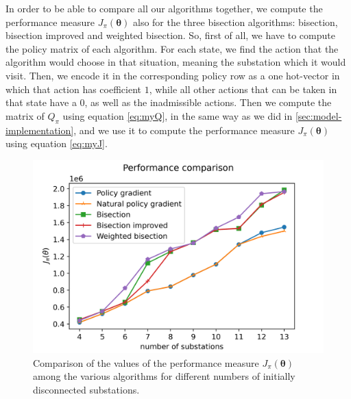 In order to be able to compare all our algorithms together, we compute the performance measure $J_\pi(\boldsymbol \theta)$ also for the three bisection algorithms: bisection, bisection improved and weighted bisection. So, first of all, we have to compute the policy matrix of each algorithm. For each state, we find the action that the algorithm would choose in that situation, meaning the substation which it would visit. Then, we encode it in the corresponding policy row as a one hot-vector in which that action has coefficient $1$, while all other actions that can be taken in that state have a $0$, as well as the inadmissible actions. Then we compute the matrix of $Q_\pi$ using equation \eqref{eq:myQ}, in the same way as we did in \autoref{sec:model-implementation}, and we use it to compute the performance measure $J_\pi(\boldsymbol \theta)$ using equation \eqref{eq:myJ}.

\begin{figure}[htb]
    \centering
    \includegraphics[scale=0.9]{chapters/figures/comparison_graph.png}
    \caption{Comparison of the values of the performance measure $J_\pi (\boldsymbol \theta)$ among the various algorithms for different numbers of initially disconnected substations.}
    \label{fig:comparison-graph}
\end{figure}


